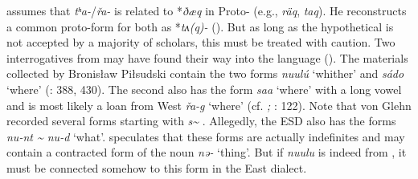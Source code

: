 \citet[1371]{Fortescue2011} assumes that  \textit{tʰ}\textit{a-}/\textit{řa-} is related to *\textit{ðæq} in Proto- (e.g.,  \textit{räq},  \textit{taq}). He reconstructs a common proto-form for both as *\textit{tʌ(q)-} (). But as long as the hypothetical  is not accepted by a majority of scholars, this must be treated with caution. Two interrogatives from  may have found their way into the  language  (). The  materials collected by Bronisław Piłsudski contain the two forms \textit{nuulú} ‘whither’ and \textit{sádo} ‘where’ (\citealt{Majewicz2011}: 388, 430). The second  also has the form \textit{saa} ‘where’ with a long vowel and is most likely a loan from West   \textit{řa}\textit{-}\textit{g} ‘where’ (cf. \citealt{Ikegami1997}\emph{\textup{;}} \citealt{Pevnov2009}: 122). Note that von Glehn recorded several forms starting with \textit{s{\textasciitilde}} \citep{Grube1892}. Allegedly, the ESD also has the forms \textit{nu-nt {\textasciitilde} nu-d} ‘what’. \citet[1372]{Fortescue2011} speculates that these forms are actually indefinites and may contain a contracted form of the noun \textit{nə-} ‘thing’. But if  \textit{nuulu} is indeed from , it must be connected somehow to this form in the East  dialect.